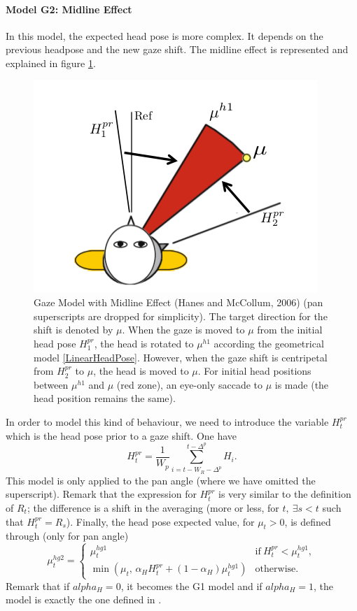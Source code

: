 \documentclass[11pt,a4paper]{article}
\begin{document}
\paragraph{Model G2: Midline Effect}
In this model, the expected head pose is more complex. It depends on the previous headpose and the new gaze shift. The midline effect \cite{HanesMcCollum2006} is represented and explained in figure \ref{MidlineEffect}.

\begin{figure}[!h]
\centering
\includegraphics[scale = 0.5]{./Pictures/MidlineEffect.png}
\caption{Gaze Model with Midline Effect (Hanes and McCollum, 2006) (pan superscripts are dropped for simplicity). The target direction for the shift is denoted by $\mu$. When the gaze is moved to $\mu$ from the initial head pose $H_1^{pr}$, the head is rotated to $\mu^{h1}$ according the geometrical model \ref{LinearHeadPose}. However, when the gaze shift is centripetal from $H_2^{pr}$ to $\mu$, the head is moved to $\mu$. For initial head positions between $\mu^{h1}$ and $\mu$ (red zone), an eye-only saccade to $\mu$ is made (the head position remains the same). \label{MidlineEffect}}
\end{figure}

In order to model this kind of behaviour, we need to introduce the variable $H_t^{pr}$ which is the head pose prior to a gaze shift. One have
\begin{equation}
H_t^{pr} = \frac{1}{W_p} \sum_{i=t-W_R-\Delta^p}^{t-\Delta^p} H_i.
\end{equation}
This model is only applied to the pan angle (where we have omitted the superscript). Remark that the expression for $H_t^{pr}$ is very similar to the definition of $R_t$; the difference is a shift in the averaging (more or less, for $t,~\exists s < t$ such that $H_t^{pr} = R_s$). Finally, the head pose expected value, for $\mu_t > 0$, is defined through (only for pan angle)
\begin{equation}
\mu_t^{hg2} = 
\left\{
\begin{array}{ll}
\mu_t^{hg1} & \text{if}~ H_t^{pr} < \mu_t^{hg1}, \\
\min(\mu_t,\, \alpha_H H_t^{pr} + (1-\alpha_H)\mu_t^{hg1}) & \text{otherwise}.
\end{array}
\right.
\end{equation}
Remark that if $alpha_H = 0$, it becomes the G1 model and if $alpha_H = 1$, the model is exactly the one defined in \cite{HanesMcCollum2006}.
\end{document}
